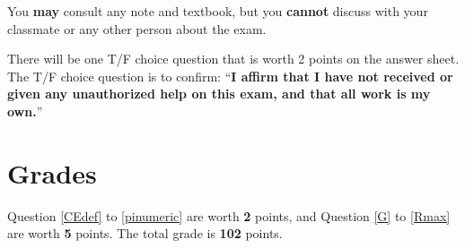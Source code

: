 \documentclass[14pt]{extarticle}
\begin{document}
You \textbf{may} consult any note and textbook, but you \textbf{cannot} discuss with your classmate or any other person about the exam.



There will be one T/F choice question that is worth 2 points on the answer sheet. The T/F choice question is to confirm: ``\textbf{I affirm that I have not received or given any unauthorized help on this exam, and that all work is my own.}''

\section*{Grades}
\label{sec:Grades}

Question \ref{CEdef} to \ref{pinumeric} are worth \textbf{2} points, and Question \ref{G} to \ref{Rmax} are worth \textbf{5} points.
The total grade is \textbf{102} points.


\newpage
\end{document}
